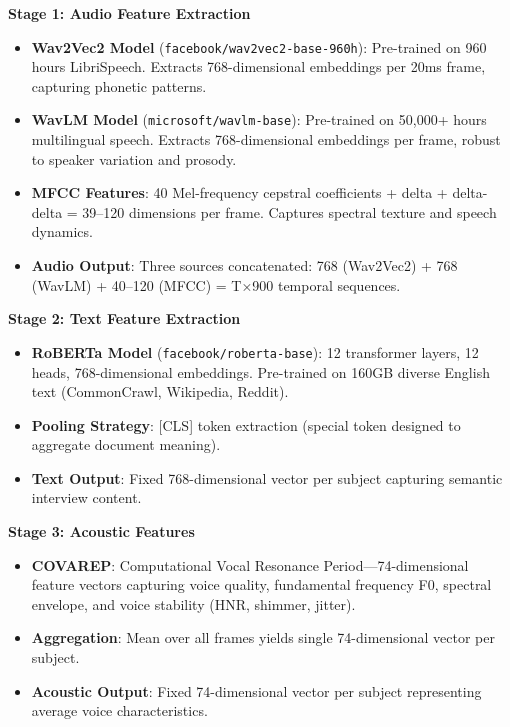 \documentclass[12pt]{article}
\begin{document}
	\textbf{Stage 1: Audio Feature Extraction}
	\begin{itemize}
		\item \textbf{Wav2Vec2 Model} (\texttt{facebook/wav2vec2-base-960h}): Pre-trained on 960 hours LibriSpeech. Extracts 768-dimensional embeddings per 20ms frame, capturing phonetic patterns.
		\item \textbf{WavLM Model} (\texttt{microsoft/wavlm-base}): Pre-trained on 50,000+ hours multilingual speech. Extracts 768-dimensional embeddings per frame, robust to speaker variation and prosody.
		\item \textbf{MFCC Features}: 40 Mel-frequency cepstral coefficients + delta + delta-delta = 39--120 dimensions per frame. Captures spectral texture and speech dynamics.
		\item \textbf{Audio Output}: Three sources concatenated: 768 (Wav2Vec2) + 768 (WavLM) + 40--120 (MFCC) = T×900 temporal sequences.
	\end{itemize}

	\textbf{Stage 2: Text Feature Extraction}
	\begin{itemize}
		\item \textbf{RoBERTa Model} (\texttt{facebook/roberta-base}): 12 transformer layers, 12 heads, 768-dimensional embeddings. Pre-trained on 160GB diverse English text (CommonCrawl, Wikipedia, Reddit).
		\item \textbf{Pooling Strategy}: [CLS] token extraction (special token designed to aggregate document meaning).
		\item \textbf{Text Output}: Fixed 768-dimensional vector per subject capturing semantic interview content.
	\end{itemize}

	\textbf{Stage 3: Acoustic Features}
	\begin{itemize}
		\item \textbf{COVAREP}: Computational Vocal Resonance Period—74-dimensional feature vectors capturing voice quality, fundamental frequency F0, spectral envelope, and voice stability (HNR, shimmer, jitter).
		\item \textbf{Aggregation}: Mean over all frames yields single 74-dimensional vector per subject.
		\item \textbf{Acoustic Output}: Fixed 74-dimensional vector per subject representing average voice characteristics.
	\end{itemize}
\end{document}
